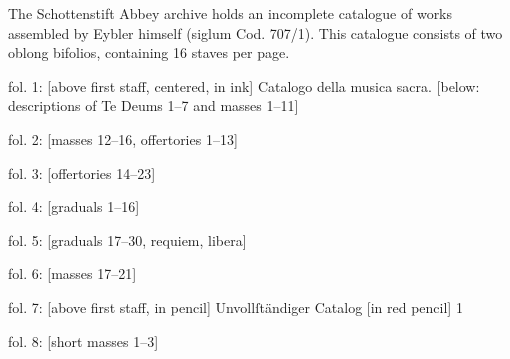 \documentclass{ees}
\begin{document}
The Schottenstift Abbey archive holds an incomplete catalogue of works assembled by Eybler himself (siglum Cod. 707/1). This catalogue consists of two oblong bifolios, containing 16 staves per page.
\begin{bulletlist}
  \item fol. 1: [above first staff, centered, in ink] Catalogo della musica sacra. [below: descriptions of Te Deums 1–7 and masses 1–11]
  \item fol. 2: [masses 12–16, offertories 1–13]
  \item fol. 3: [offertories 14–23]
  \item fol. 4: [graduals 1–16]
  \item fol. 5: [graduals 17–30, requiem, libera]
  \item fol. 6: [masses 17–21]
  \item fol. 7: [above first staff, in pencil] Unvollſtändiger Catalog [in red pencil] 1
  \item fol. 8: [short masses 1–3]
\end{bulletlist}
\end{document}
